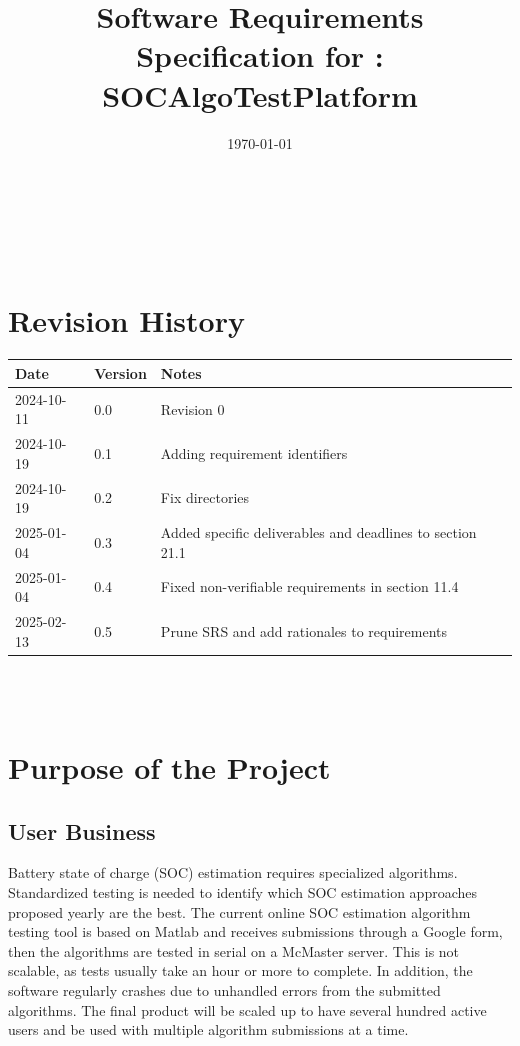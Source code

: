 \documentclass[12pt]{article}
\begin{document}
\title{Software Requirements Specification for \progname: SOCAlgoTestPlatform} 
\author{\authname}
\date{\today}
	
\maketitle

~\newpage


\tableofcontents

~\newpage

\section*{Revision History}

\begin{tabularx}{\textwidth}{p{3cm}p{2cm}X}
\toprule {\textbf{Date}} & {\textbf{Version}} & {\textbf{Notes}}\\
\midrule
2024-10-11 & 0.0 & Revision 0\\
2024-10-19 & 0.1 & Adding requirement identifiers \\
2024-10-19 & 0.2 & Fix directories \\
2025-01-04 & 0.3 & Added specific deliverables and deadlines to section 21.1 \\
2025-01-04 & 0.4 & Fixed non-verifiable requirements in section 11.4  \\
2025-02-13 & 0.5 & Prune SRS and add rationales to requirements  \\
\bottomrule
\end{tabularx}

~\\

~\newpage
\section{Purpose of the Project}
\subsection{User Business}
Battery state of charge (SOC) estimation requires specialized algorithms. Standardized testing is needed to identify which SOC estimation approaches proposed yearly are the best. The current online SOC estimation algorithm testing tool is based on Matlab and receives submissions through a Google form, then the algorithms are tested in serial on a McMaster server. This is not scalable, as tests usually take an hour or more to complete. In addition, the software regularly crashes due to unhandled errors from the submitted algorithms. The final product will be scaled up to have several hundred active users and be used with multiple algorithm submissions at a time.
\end{document}
